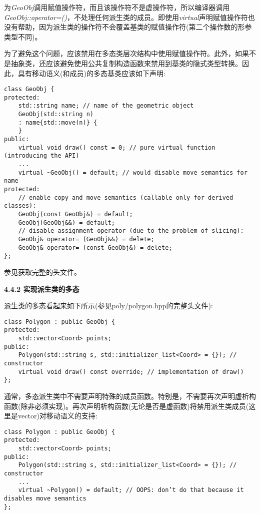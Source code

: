为\textit{GeoObj}调用赋值操作符，而且该操作符不是虚操作符，所以编译器调用\textit{GeoObj::operator=()}，不处理任何派生类的成员。即使用\textit{virtual}声明赋值操作符也没有帮助，因为派生类的操作符不会覆盖基类的赋值操作符(第二个操作数的形参类型不同)。\par

为了避免这个问题，应该禁用在多态类层次结构中使用赋值操作符。此外，如果不是抽象类，还应该避免使用公共复制构造函数来禁用到基类的隐式类型转换。因此，具有移动语义(和成员)的多态基类应该如下声明:\par

\begin{lstlisting}[caption={}]
class GeoObj {
protected:
	std::string name; // name of the geometric object
	GeoObj(std::string n)
	: name{std::move(n)} {
	}
public:
	virtual void draw() const = 0; // pure virtual function (introducing the API)
	...
	virtual ~GeoObj() = default; // would disable move semantics for name
protected:
	// enable copy and move semantics (callable only for derived classes):
	GeoObj(const GeoObj&) = default;
	GeoObj(GeoObj&&) = default;
	// disable assignment operator (due to the problem of slicing):
	GeoObj& operator= (GeoObj&&) = delete;
	GeoObj& operator= (const GeoObj&) = delete;
};
\end{lstlisting}

参见{\color{red}{poly/geoobj.hpp}}获取完整的头文件。

\hspace*{\fill} \par %
\textbf{4.4.2 实现派生类的多态}

派生类的多态看起来如下所示(参见poly/polygon.hpp的完整头文件):\par

\begin{lstlisting}[caption={}]
class Polygon : public GeoObj {
protected:
	std::vector<Coord> points;
public:
	Polygon(std::string s, std::initializer_list<Coord> = {}); // constructor
	virtual void draw() const override; // implementation of draw()
};
\end{lstlisting}

通常，多态派生类中不需要声明特殊的成员函数。特别是，不需要再次声明虚析构函数(除非必须实现)。再次声明析构函数(无论是否是虚函数)将禁用派生类成员(这里是vector)对移动语义的支持:\par

\begin{lstlisting}[caption={}]
class Polygon : public GeoObj {
protected:
	std::vector<Coord> points;
public:
	Polygon(std::string s, std::initializer_list<Coord> = {}); // constructor
	...
	virtual ~Polygon() = default; // OOPS: don’t do that because it disables move semantics
};
\end{lstlisting}

